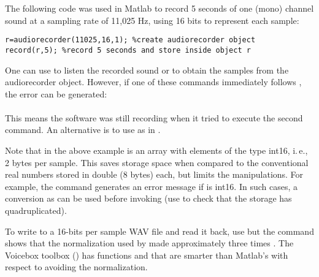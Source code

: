 The following code was used in Matlab to record 5 seconds of one (mono) channel sound at a sampling rate of 11,025 Hz, using 16 bits to represent each sample:
\begin{lstlisting}
r=audiorecorder(11025,16,1); %create audiorecorder object
record(r,5); %record 5 seconds and store inside object r
\end{lstlisting}

One can use  to listen the recorded sound or  to obtain the samples from the audiorecorder object. However, if one of these commands immediately follows , the error can be generated:\\
\\
This means the software was still recording when it tried to execute the second command. An alternative is to use  as in .


Note that  in the above example is an array with elements of the type int16, i.\,e., 2 bytes per sample. This saves storage space when compared to the conventional real numbers stored in double (8 bytes) each, but limits the manipulations. For example, the command  generates an error message if  is int16. In such cases, a conversion as  can be used before invoking  (use  to check that the storage has quadruplicated).

To write  to a 16-bits per sample WAV file and read it back, use  but the command  shows that the normalization used by  made  approximately three times .
The Voicebox toolbox () has functions  and  that are smarter than Matlab's with respect to avoiding the normalization.




